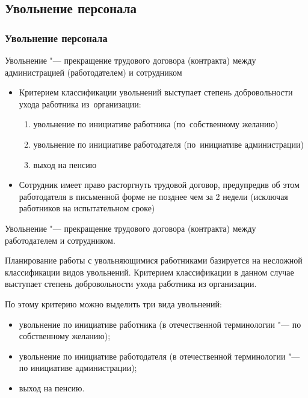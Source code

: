 \documentclass{../industrial-development}
\begin{document}
\subsection{Увольнение персонала}
\begin{frame} \frametitle{Увольнение персонала}


\alert{Увольнение} "--- прекращение трудового договора (контракта) между администрацией (работодателем) и сотрудником 


  \begin{itemize}
\item Критерием классификации увольнений выступает степень добровольности ухода работника из~организации:
  \begin{enumerate}
\item увольнение по инициативе работника (по~собственному желанию)
\item увольнение по инициативе работодателя (по~инициативе администрации)
\item выход на пенсию
	  \end{enumerate}
		\item Сотрудник имеет право расторгнуть трудовой договор, предупредив об этом работодателя в письменной форме не позднее чем за 2 недели (исключая работников на испытательном сроке)

	  \end{itemize}

\end{frame}

\lecturenotes

Увольнение "--- прекращение трудового договора (контракта) между работодателем и сотрудником.

Планирование работы с увольняющимися работниками базируется на несложной классификации видов увольнений. Критерием классификации в данном случае выступает степень добровольности ухода работника из организации.

По этому критерию можно выделить три вида увольнений:
 \begin{itemize}
\item увольнение по инициативе работника (в отечественной терминологии "--- по собственному желанию);
\item увольнение по инициативе работодателя (в отечественной терминологии "--- по инициативе администрации);
\item выход на пенсию.
 \end{itemize}
\end{document}
